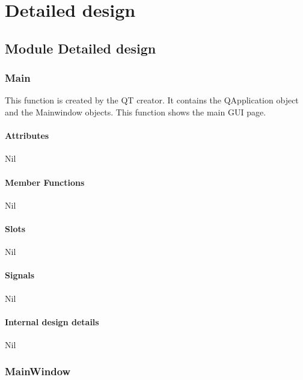 \chapter{Detailed design}
\label{Chapter5}
\section{Module Detailed design}

\subsection{Main }
This function is created by the QT creator. It contains the QApplication object and the Mainwindow objects. This function shows the main GUI page. 
\subsubsection{Attributes}
Nil
\subsubsection{Member Functions }
Nil
\subsubsection{Slots}
Nil
\subsubsection{Signals}
Nil
\subsubsection{Internal design details }
Nil

\subsection{MainWindow}
